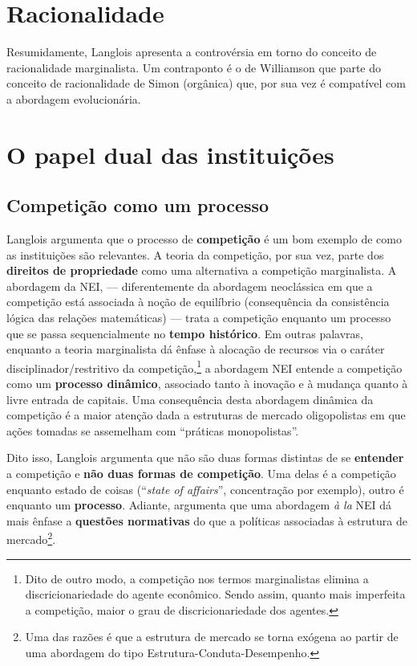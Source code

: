 \documentclass[9pt,twocolumn,twoside,lineno]{style}
\begin{document}
\section{Racionalidade}

Resumidamente, Langlois apresenta a controvérsia em torno do conceito de racionalidade marginalista. Um contraponto é o de Williamson que parte do conceito de racionalidade de Simon (orgânica) que, por sua vez é compatível com a abordagem evolucionária.

\section{O papel dual das instituições}

\subsection{Competição como um processo}

Langlois argumenta que o processo de \textbf{competição} é um bom exemplo de como as instituições são relevantes. A teoria da competição, por sua vez, parte dos \textbf{direitos de propriedade} como uma alternativa a competição marginalista. A abordagem da NEI, --- diferentemente da abordagem neoclássica em que a competição está associada à noção de equilíbrio (consequência da consistência lógica das relações matemáticas) --- trata a competição enquanto um processo que se passa sequencialmente no \textbf{tempo histórico}. Em outras palavras, enquanto a teoria marginalista dá ênfase à alocação de recursos via o caráter disciplinador/restritivo da competição,\footnote{Dito de outro modo, a competição nos termos marginalistas elimina a discricionariedade do agente econômico. Sendo assim, quanto mais imperfeita a competição, maior o grau de discricionariedade dos agentes.} a abordagem NEI entende a competição como um \textbf{processo dinâmico}, associado tanto à inovação e à mudança quanto à livre entrada de capitais. Uma consequência desta abordagem dinâmica da competição é a maior atenção dada a estruturas de mercado oligopolistas em que ações tomadas se assemelham com ``práticas monopolistas''.

Dito isso, Langlois argumenta que não são duas formas distintas de se \textbf{entender} a competição e \textbf{não duas formas de competição}. Uma delas é a competição enquanto estado de coisas (``\textit{state of affairs}'', concentração por exemplo), outro é enquanto um \textbf{processo}. Adiante, argumenta que uma abordagem \textit{à la} NEI dá mais ênfase a \textbf{questões normativas} do que a políticas associadas à estrutura de mercado\footnote{Uma das razões é que a estrutura de mercado se torna exógena ao partir de uma abordagem do tipo Estrutura-Conduta-Desempenho.}.
\end{document}
